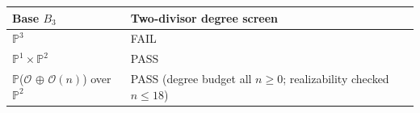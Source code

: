 \begin{tabular}{ll}
\toprule
Base $B_3$ & Two-divisor degree screen \\
\midrule
$\mathbb{P}^3$ & FAIL \\
$\mathbb{P}^1\times\mathbb{P}^2$ & PASS \\
$\mathbb{P}$($\mathcal{O}$ $\oplus$ $\mathcal{O}(n)$) over $\mathbb{P}^2$ & PASS (degree budget all $n\ge0$; realizability checked $n\le18$) \\
\bottomrule
\end{tabular}
